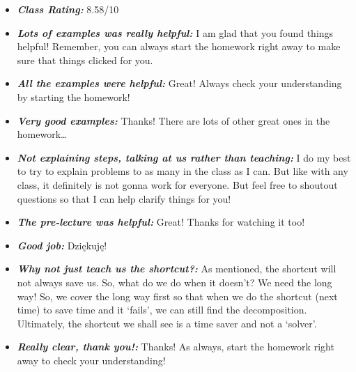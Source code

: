 \documentclass[11pt,letterpaper]{article}
\begin{document}
\begin{itemize}
\item {\bfseries\itshape Class Rating:} 8.58/10

\item {\bfseries\itshape Lots of examples was really helpful:} I am glad that you found things helpful! Remember, you can always start the homework right away to make sure that things clicked for you. 

\item {\bfseries\itshape All the examples were helpful:} Great! Always check your understanding by starting the homework!

\item {\bfseries\itshape Very good examples:} Thanks! There are lots of other great ones in the homework\dots \Winkey

\item {\bfseries\itshape Not explaining steps, talking at us rather than teaching:} I do my best to try to explain problems to as many in the class as I can. But like with any class, it definitely is not gonna work for everyone. But feel free to shoutout questions so that I can help clarify things for you!

\item {\bfseries\itshape The pre-lecture was helpful:} Great! Thanks for watching it too!

\item {\bfseries\itshape Good job:} Dziękuję!

\item {\bfseries\itshape Why not just teach us the shortcut?:} As mentioned, the shortcut will not always save us. So, what do we do when it doesn't? We need the long way! So, we cover the long way first so that when we do the shortcut (next time) to save time and it `fails', we can still find the decomposition. Ultimately, the shortcut we shall see is a time saver and not a `solver'. 

\item {\bfseries\itshape Really clear, thank you!:} Thanks! As always, start the homework right away to check your understanding!


\end{itemize}
\end{document}
